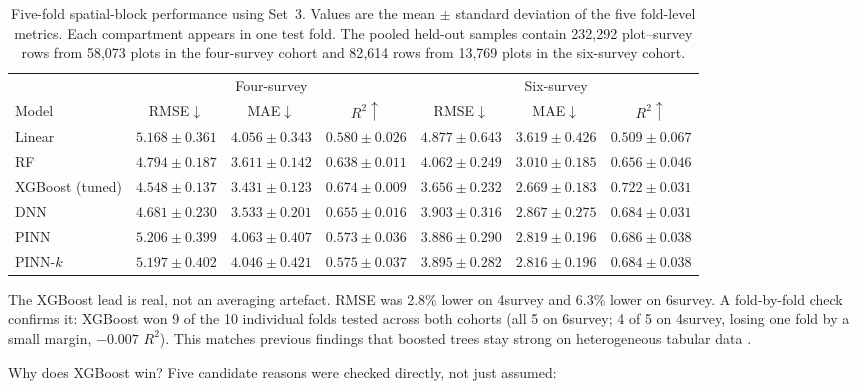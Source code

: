 \begin{table}[!htbp]
\centering
\scriptsize
\setlength{\tabcolsep}{3pt}
\renewcommand{\arraystretch}{0.95}
\begin{tabular}{lccc|ccc}
\toprule
& \multicolumn{3}{c|}{Four-survey}
& \multicolumn{3}{c}{Six-survey} \\
Model
& RMSE$\downarrow$ & MAE$\downarrow$ & $R^2\uparrow$
& RMSE$\downarrow$ & MAE$\downarrow$ & $R^2\uparrow$ \\
\midrule
Linear
& $5.168{\pm}0.361$ & $4.056{\pm}0.343$ & $0.580{\pm}0.026$
& $4.877{\pm}0.643$ & $3.619{\pm}0.426$ & $0.509{\pm}0.067$ \\
RF
& $4.794{\pm}0.187$ & $3.611{\pm}0.142$ & $0.638{\pm}0.011$
& $4.062{\pm}0.249$ & $3.010{\pm}0.185$ & $0.656{\pm}0.046$ \\
XGBoost (tuned)
& $\mathbf{4.548{\pm}0.137}$ & $\mathbf{3.431{\pm}0.123}$ & $\mathbf{0.674{\pm}0.009}$
& $\mathbf{3.656{\pm}0.232}$ & $\mathbf{2.669{\pm}0.183}$ & $\mathbf{0.722{\pm}0.031}$ \\
DNN
& $4.681{\pm}0.230$ & $3.533{\pm}0.201$ & $0.655{\pm}0.016$
& $3.903{\pm}0.316$ & $2.867{\pm}0.275$ & $0.684{\pm}0.031$ \\
PINN
& $5.206{\pm}0.399$ & $4.063{\pm}0.407$ & $0.573{\pm}0.036$
& $3.886{\pm}0.290$ & $2.819{\pm}0.196$ & $0.686{\pm}0.038$ \\
PINN-$k$
& $5.197{\pm}0.402$ & $4.046{\pm}0.421$ & $0.575{\pm}0.037$
& $3.895{\pm}0.282$ & $2.816{\pm}0.196$ & $0.684{\pm}0.038$ \\
\bottomrule
\end{tabular}
\caption{Five-fold spatial-block performance using Set~3. Values are the mean $\pm$ standard
deviation of the five fold-level metrics. Each compartment appears in one test fold. The pooled
held-out samples contain 232{,}292 plot--survey rows from 58{,}073 plots in the four-survey cohort
and 82{,}614 rows from 13{,}769 plots in the six-survey cohort.}
\label{tab:results-rq1}
\end{table}

The XGBoost lead is real, not an averaging artefact. RMSE was 2.8\% lower on 4survey and 6.3\%
lower on 6survey. A fold-by-fold check confirms it: XGBoost won 9 of the 10 individual folds
tested across both cohorts (all 5 on 6survey; 4 of 5 on 4survey, losing one fold by a small
margin, $-0.007$ $R^2$). This matches previous findings that boosted trees stay strong on
heterogeneous tabular data \citep{shwartzziv2021Tabular_C4_NN}.

Why does XGBoost win? Five candidate reasons were checked directly, not just assumed:

